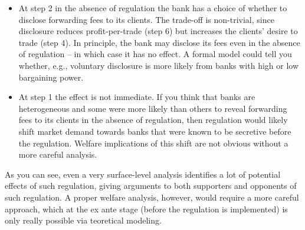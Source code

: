 \documentclass[11pt
, answers
]{exam}
\begin{document}
\begin{solution}
\begin{itemize}[nolistsep,noitemsep]
		\item At step 2 in the absence of regulation the bank has a choice of whether to disclose forwarding fees to its clients. The trade-off is non-trivial, since disclosure reduces profit-per-trade (step 6) but increases the clients' desire to trade (step 4). In principle, the bank may disclose its fees even in the absence of regulation -- in which case it has no effect. A formal model could tell you whether, e.g., voluntary disclosure is more likely from banks with high or low bargaining power.
		
		\item At step 1 the effect is not immediate. If you think that banks are heterogeneous and some were more likely than others to reveal forwarding fees to its clients in the absence of regulation, then regulation would likely shift market demand towards banks that were known to be secretive before the regulation. Welfare implications of this shift are not obvious without a more careful analysis.
	\end{itemize}
	As you can see, even a very surface-level analysis identifies a lot of potential effects of such regulation, giving arguments to both supporters and opponents of such regulation. A proper welfare analysis, however, would require a more careful approach, which at the ex ante stage (before the regulation is implemented) is only really possible via teoretical modeling.
\end{solution}
\end{document}
